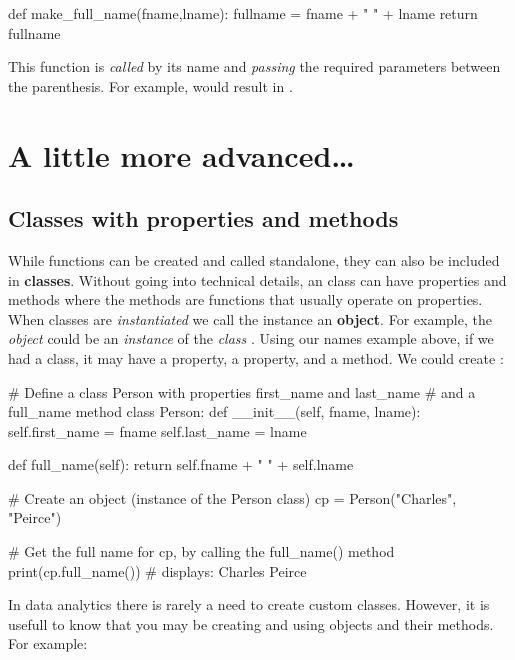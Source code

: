 \begin{pycode}
    def make_full_name(fname,lname):
        fullname =  fname + " " + lname
        return fullname
\end{pycode}

This function is \textit{called} by its name and \textit{passing} the required parameters between the parenthesis. For example,  would result in .

\section{A little more advanced\ldots}

\subsection{Classes with properties and methods}

While functions can be created and called standalone, they can also be included in \textbf{classes}. Without going into technical details, an class can have properties and methods where the methods are functions that usually operate on properties. When classes are \textit{instantiated} we call the instance an \textbf{object}. For example, the \textit{object}  could be an \textit{instance} of the \textit{class} . Using our names example above, if we had a  class, it may have a  property, a  property, and a  method. We could create :

\begin{pycode}
    # Define a class Person with properties first_name and last_name
    # and a full_name method
    class Person:
        def __init__(self, fname, lname):
            self.first_name = fname
            self.last_name = lname

        def full_name(self):
            return self.fname + " " + self.lname

    # Create an object (instance of the Person class)
    cp = Person("Charles", "Peirce")

    # Get the full name for cp, by calling the full_name() method
    print(cp.full_name()) # displays: Charles Peirce
\end{pycode}

In data analytics there is rarely a need to create custom classes. However, it is usefull to know that you may be creating and using objects and their methods. For example:

